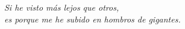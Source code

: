 
\chapter*{} %
\begin{flushright}
\textit{\Large Si he visto más lejos que otros,\\ es porque me he subido en hombros de gigantes.}
\vspace{1cm}

\end{flushright}
